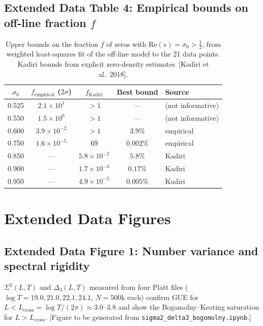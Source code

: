 \documentclass[10pt]{article}
\begin{document}
\subsection{Extended Data Table 4: Empirical bounds on off-line fraction $f$}

\begin{table}[h]
\centering
\caption{Upper bounds on the fraction $f$ of zeros with
$\mathrm{Re}(s) = \sigma_0 > \tfrac{1}{2}$, from weighted least-squares fit
of the off-line model to the 21 data points.
Kadiri bounds from explicit zero-density estimates~[Kadiri et al.\ 2018].}
\label{tab:fbounds}
\begin{tabular}{ccccl}
\toprule
$\sigma_0$ & $f_{\mathrm{empirical}}$ ($2\sigma$) & $f_{\mathrm{Kadiri}}$ & Best bound & Source \\
\midrule
0.525 & $2.1\times 10^1$ & $>1$ & --- & (not informative) \\
0.550 & $1.5\times 10^0$ & $>1$ & --- & (not informative) \\
0.600 & $3.9\times 10^{-2}$ & $>1$ & $3.9\%$ & empirical \\
0.750 & $1.6\times 10^{-5}$ & $69$ & $0.002\%$ & empirical \\
0.850 & --- & $5.8\times 10^{-2}$ & $5.8\%$ & Kadiri \\
0.900 & --- & $1.7\times 10^{-3}$ & $0.17\%$ & Kadiri \\
0.950 & --- & $4.9\times 10^{-5}$ & $0.005\%$ & Kadiri \\
\bottomrule
\end{tabular}
\end{table}


\section{Extended Data Figures}

\subsection{Extended Data Figure 1: Number variance and spectral rigidity}

$\Sigma^2(L, T)$ and $\Delta_3(L, T)$ measured from four Platt files
($\log T = 19.0, 21.0, 22.1, 24.1$, $N = 500$k each) confirm GUE for
$L < L_{\mathrm{cross}} = \log T / (2\pi) \approx 3.0$--$3.8$ and show
the Bogomolny--Keating saturation for $L > L_{\mathrm{cross}}$.
[Figure to be generated from \texttt{sigma2\_delta3\_bogomolny.ipynb}.]
\end{document}
